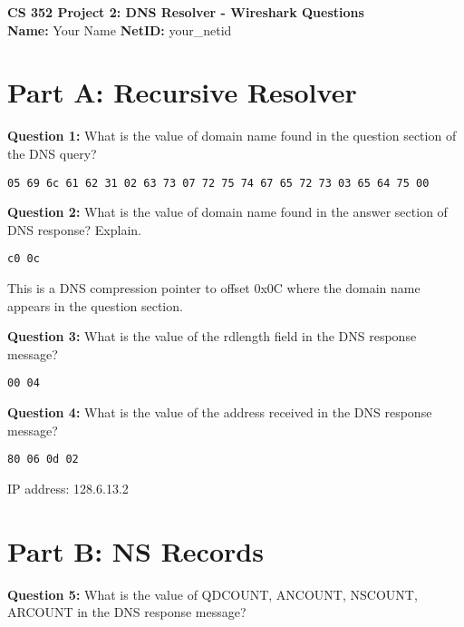 \documentclass[11pt]{article}
\begin{document}
\noindent
\textbf{\Large CS 352 Project 2: DNS Resolver - Wireshark Questions}\\[0.2cm]
\textbf{Name:} Your Name \hspace{2cm} \textbf{NetID:} your\_netid\\[0.5cm]

\section*{Part A: Recursive Resolver}

\textbf{Question 1:} What is the value of domain name found in the question section of the DNS query?

\begin{lstlisting}
05 69 6c 61 62 31 02 63 73 07 72 75 74 67 65 72 73 03 65 64 75 00
\end{lstlisting}

\vspace{0.3cm}

\textbf{Question 2:} What is the value of domain name found in the answer section of DNS response? Explain.

\begin{lstlisting}
c0 0c
\end{lstlisting}
This is a DNS compression pointer to offset 0x0C where the domain name appears in the question section.

\vspace{0.3cm}

\textbf{Question 3:} What is the value of the rdlength field in the DNS response message?

\begin{lstlisting}
00 04
\end{lstlisting}

\vspace{0.3cm}

\textbf{Question 4:} What is the value of the address received in the DNS response message?

\begin{lstlisting}
80 06 0d 02
\end{lstlisting}
IP address: 128.6.13.2

\vspace{0.5cm}

\section*{Part B: NS Records}

\textbf{Question 5:} What is the value of QDCOUNT, ANCOUNT, NSCOUNT, ARCOUNT in the DNS response message?
\end{document}
